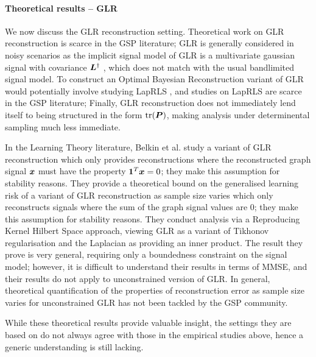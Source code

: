 \paragraph{Theoretical results -- GLR}We now discuss the GLR reconstruction setting. Theoretical work on GLR reconstruction is scarce in the GSP literature; GLR is generally considered in noisy scenarios as the implicit signal model of GLR is a multivariate gaussian signal with covariance $\bm{L}^{\dagger}$ \cite{dong2016learning}, which does not match with the usual bandlimited signal model.  To construct an Optimal Bayesian Reconstruction variant of GLR would potentially involve studying LapRLS \cite[Section 4.2]{belkin2006manifold}, and studies on LapRLS are scarce in the GSP literature; Finally, GLR reconstruction does not immediately lend itself to being structured in the form $\text{tr}(\bm{P})$, making analysis under determinental sampling much less immediate.

In the Learning Theory literature, Belkin et al. \cite{belkin2004tikhonov} study a variant of GLR reconstruction which only provides reconstructions where the reconstructed graph signal $\bm{x}$ must have the property $\bm{1}^{T}\bm{x}=  0$; they make this assumption for stability reasons. They provide a theoretical bound on the generalised learning risk of a variant of GLR reconstruction as sample size varies which only reconstructs signals where the sum of the graph signal values are 0; they make this assumption for stability reasons. They conduct analysis via a Reproducing Kernel Hilbert Space approach, viewing GLR as a variant of Tikhonov regularisation and the Laplacian as providing an inner product. The result they prove is very general, requiring only a boundedness constraint on the signal model; however, it is difficult to understand their results in terms of MMSE, and their results do not apply to unconstrained version of GLR. In general, theoretical quantification of the properties of reconstruction error as sample size varies for unconstrained GLR has not been tackled by the GSP community.

While these theoretical results provide valuable insight, the settings they are based on do not always agree with those in the empirical studies above, hence a generic understanding is still lacking. %

